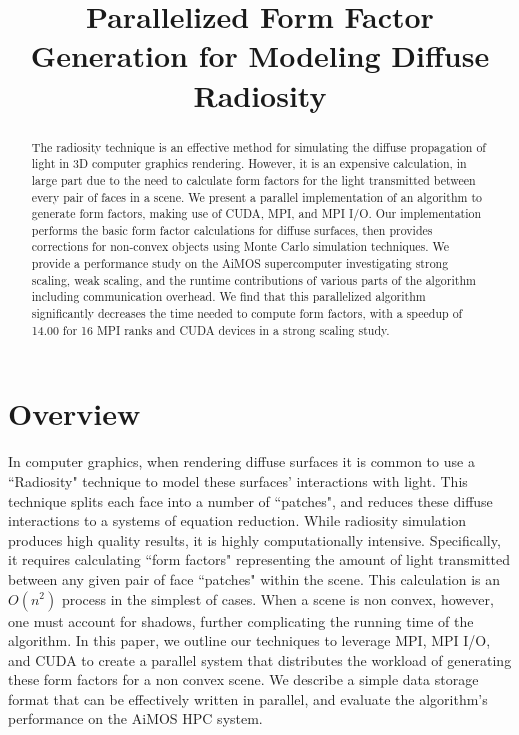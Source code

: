 \documentclass[conference]{IEEEtran}
\begin{document}
\title{Parallelized Form Factor Generation for Modeling Diffuse Radiosity}

\author{
\and
{}
}
\maketitle
\begin{abstract}
The radiosity technique is an effective method for simulating the diffuse propagation of light in 3D computer graphics rendering. However, it is an expensive calculation, in large part due to the need to calculate form factors for the light transmitted between every pair of faces in a scene. We present a parallel implementation of an algorithm to generate form factors, making use of CUDA, MPI, and MPI I/O. Our implementation performs the basic form factor calculations for diffuse surfaces, then provides corrections for non-convex objects using Monte Carlo simulation techniques. We provide a performance study on the AiMOS supercomputer investigating strong scaling, weak scaling, and the runtime contributions of various parts of the algorithm including communication overhead. We find that this parallelized algorithm significantly decreases the time needed to compute form factors, with a speedup of 14.00 for 16 MPI ranks and CUDA devices in a strong scaling study.
\end{abstract}

\section{Overview}
In computer graphics, when rendering diffuse surfaces it is common to use a ``Radiosity" technique to model these surfaces' interactions with light. This technique splits each face into a number of ``patches", and reduces these diffuse interactions to a systems of equation reduction. While radiosity simulation produces high quality results, it is highly computationally intensive. Specifically, it requires calculating ``form factors" representing the amount of light transmitted between any given pair of face ``patches" within the scene. This calculation is an $O(n^2)$ process in the simplest of cases. When a scene is non convex, however, one must account for shadows, further complicating the running time of the algorithm. In this paper, we outline our techniques to leverage MPI, MPI I/O, and CUDA to create a parallel system that distributes the workload of generating these form factors for a non convex scene. We describe a simple data storage format that can be effectively written in parallel, and evaluate the algorithm's performance on the AiMOS HPC system. 
\end{document}
